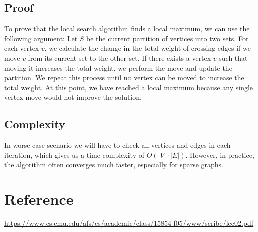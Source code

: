 \documentclass[12pt,a4paper]{article}
\begin{document}
\subsection{Proof}
To prove that the local search algorithm finds a local maximum, we can use the following argument:
Let $S$ be the current partition of vertices into two sets. For each vertex $v$, we calculate the change
in the total weight of crossing edges if we move $v$ from its current set to the other set. If there
exists a vertex $v$ such that moving it increases the total weight, we perform the move and update the partition.
We repeat this process until no vertex can be moved to increase the total weight.
At this point, we have reached a local maximum because any single vertex move would not improve the solution.

\subsection{Complexity}
In worse case scenario we will have to check all vertices and edges in each iteration, which gives us a time complexity
of $O(|V| \cdot |E|)$. However, in practice, the algorithm often converges much faster, especially for sparse graphs.

\section{Reference}
\url{https://www.cs.cmu.edu/afs/cs/academic/class/15854-f05/www/scribe/lec02.pdf}
\end{document}

